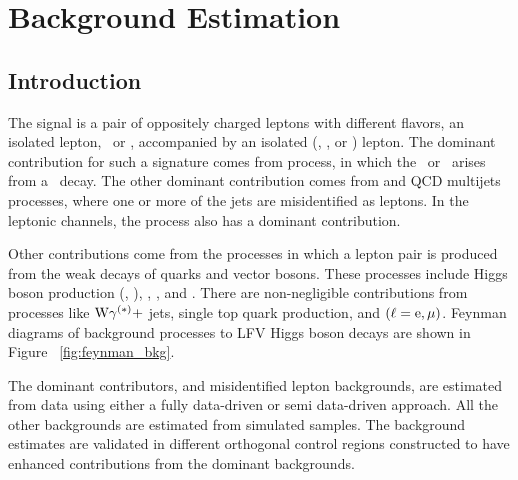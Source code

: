 %
%

\chapter{Background Estimation}
\label{bg_val}

\section{Introduction}
The signal is a pair of oppositely charged leptons with different flavors, an isolated lepton, \Pe\, or \Pgm, accompanied by an isolated \Pgt (\taum, \taue, or \tauh) lepton. The dominant contribution for such a signature comes from \Ztt process, in which the \Pgm\, or \Pe\, arises from a \Pgt\, decay. The other dominant contribution comes from \wjets and QCD multijets processes, where one or more of the jets are misidentified as leptons. In the leptonic channels, the \ttbar process also has a dominant contribution.

Other contributions come from the processes in which a lepton pair is produced from the weak decays of quarks and vector bosons. These processes include Higgs boson production (\Htt, \PW{}\PW), \PW{}\PW, \PW{}\PZ, and \PZ{}\PZ. There are non-negligible contributions from processes like $\text{W}\gamma^{(\ast)} +$ jets, single top quark production, and \Zll $(\ell=\text{e},\mu)$. Feynman diagrams of background processes to LFV Higgs boson decays are shown in Figure ~\ref{fig:feynman_bkg}.

The dominant contributors, \Ztt and misidentified lepton backgrounds, are estimated from data using either a fully data-driven or semi data-driven approach. All the other backgrounds are estimated from simulated samples. The background estimates are validated in different orthogonal control regions constructed to have enhanced contributions from the dominant backgrounds.

